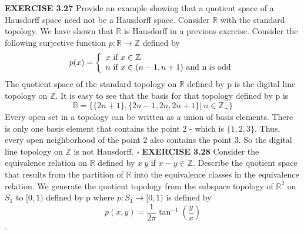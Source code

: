 \documentclass[12pt]{article}
\begin{document}
  \newpage
  \noindent
  \textbf{EXERCISE 3.27}
  Provide an example showing that a quotient space of a Hausdorff space need not be a Hausdorff space.
  \newline \newline
  Consider \(\mathbb{R}\) with the standard topology.
  \newline
  We have shown that \(\mathbb{R}\) is Hausdorff in a previous exercise.
  \newline \newline
  Consider the following surjective function \(p:\mathbb{R}\rightarrow \mathbb{Z}\) defined by
  \[p(x) = \left\{\begin{array}{ccc}
  x \textup{ if } x \in \mathbb{Z} \ \ \ \ \ \ \ \ \ \ \ \ \ \ \ \ \ \ \ \ \ \ \ \ \ \ \ \ \ \ \ \ \ \\
  n \textup{ if } x \in (n-1, n+1) \textup{ and n is odd}
  \end{array}\right.\]
  \newline
  The quotient space of the standard topology on \(\mathbb{R}\) defined by p is the digital line topology on \(\mathbb{Z}\).
  \newline \newline
  It is easy to see that the basis for that topology defined by p is \[\mathbb{B}=\{\{2n+1\},\{2n-1, 2n, 2n+1\}|\ n \in \mathbb{Z}_+\}\]
  Every open set in a topology can be written as a union of basis elements. There is only one basis element that contains the point 2 - which is \(\{1,2,3\}\).
  \newline \newline
  Thus, every open neighborhood of the point 2 also contains the point 3.
  \newline
  So the digital line topology on \(\mathbb{Z}\) is not Hausdorff.
  \newline \(\square\)
  \newpage
  \noindent
  \textbf{EXERCISE 3.28}
  Consider the equivalence relation on \(\mathbb{R}\) defined by \(x ~ y\) if \(x - y \in \mathbb{Z}\). Describe the quotient space that results from the partition of \(\mathbb{R}\) into the equivalence classes in the equivalence relation.
  \newline \newline
  We generate the quotient topology from the subspace topology of \(\mathbb{R}^2\) on \(S_1\) to \([0,1)\) defined by p where
  \newline
  \(p:S_1 \rightarrow [0,1)\) is defined by
  \[p(x,y) = \frac{1}{2\pi}\tan^{-1}\left(\frac{y}{x}\right)\].
  \newline
\end{document}
